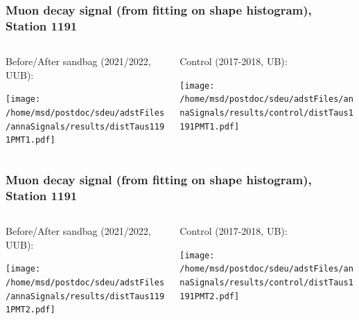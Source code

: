 \documentclass[aspectratio=169]{beamer}
\begin{document}
\begin{frame}
  \frametitle{Muon decay signal (from fitting on shape histogram), Station 1191}
  
  \begin{columns}[T,c]
    \begin{column}{.5\textwidth}
      Before/After sandbag (2021/2022, UUB):
      \vspace{.3cm}

      \texttt{[image: /home/msd/postdoc/sdeu/adstFiles/annaSignals/results/distTaus1191PMT1.pdf]}
    \end{column}
    \begin{column}{.5\textwidth}
      Control (2017-2018, UB):
      \vspace{0.3cm}

      \texttt{[image: /home/msd/postdoc/sdeu/adstFiles/annaSignals/results/control/distTaus1191PMT1.pdf]}
    \end{column}
  \end{columns}
\end{frame}

\begin{frame}
  \frametitle{Muon decay signal (from fitting on shape histogram), Station 1191}
  
  \begin{columns}[T,c]
    \begin{column}{.5\textwidth}
      Before/After sandbag (2021/2022, UUB):
      \vspace{.3cm}

      \texttt{[image: /home/msd/postdoc/sdeu/adstFiles/annaSignals/results/distTaus1191PMT2.pdf]}
    \end{column}
    \begin{column}{.5\textwidth}
      Control (2017-2018, UB):
      \vspace{0.3cm}

      \texttt{[image: /home/msd/postdoc/sdeu/adstFiles/annaSignals/results/control/distTaus1191PMT2.pdf]}
    \end{column}    
\end{columns}
\end{frame}
\end{document}
